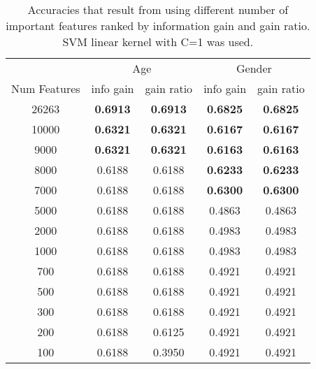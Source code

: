 \documentclass[a4paper]{llncs}
\begin{document}
\begin{table}[!htbp]
\centering
\begin{tabular}{|c|cc|cc|}
\hline
                                   & \multicolumn{2}{c|}{Age} & \multicolumn{2}{c|}{Gender} \\ %
\multicolumn{1}{|l|}{Num Features} & info gain  & gain ratio  & info gain    & gain ratio   \\ \hline
26263                              & \textbf{0.6913}     & \textbf{0.6913}      & \textbf{0.6825}       & \textbf{0.6825}       \\ %
10000                              & \textbf{0.6321}     & \textbf{0.6321}      & \textbf{0.6167}       & \textbf{0.6167}       \\ %
9000                               & \textbf{0.6321}     & \textbf{0.6321}      & \textbf{0.6163}       & \textbf{0.6163}       \\ %
8000                               & 0.6188     & 0.6188      & \textbf{0.6233}       & \textbf{0.6233}       \\ %
7000                               & 0.6188     & 0.6188      & \textbf{0.6300}       & \textbf{0.6300}       \\ %
5000                               & 0.6188     & 0.6188      & 0.4863       & 0.4863       \\ %
2000                               & 0.6188     & 0.6188      & 0.4983       & 0.4983       \\ %
1000                               & 0.6188     & 0.6188      & 0.4983       & 0.4983       \\ %
700                                & 0.6188     & 0.6188      & 0.4921       & 0.4921       \\ %
500                                & 0.6188     & 0.6188      & 0.4921       & 0.4921       \\ %
300                                & 0.6188     & 0.6188      & 0.4921       & 0.4921       \\ %
200                                & 0.6188     & 0.6125      & 0.4921       & 0.4921       \\ %
100                                & 0.6188     & 0.3950      & 0.4921       & 0.4921       \\ \hline
\end{tabular}
\caption{Accuracies that result from using different number of important features ranked by information gain and gain ratio. SVM linear kernel with C=1 was used.}
\label{table:ChoosingNumFeatures}
\end{table}
\end{document}

